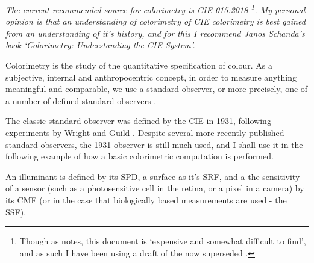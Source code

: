 \textit{The current recommended source for colorimetry is CIE 015:2018 \citep{cie_cie_2018}\footnote{Though as \citet{fairchild_cie_2019} notes, this document is `expensive and somewhat difficult to find', and as such I have been using a draft of the now superseded \citet{cie_cie_2004-2}.}. My personal opinion is that an understanding of colorimetry of CIE colorimetry is best gained from an understanding of it's history, and for this I recommend Janos Schanda's book `Colorimetry: Understanding the CIE System'\citep{schanda_colorimetry_2007}.}

Colorimetry is the study of the quantitative specification of colour. As a subjective, internal and anthropocentric concept, in order to measure anything meaningful and comparable, we use a standard observer, or more precisely, one of a number of defined standard observers \cite{cie_bs_2011}.

The classic standard observer was defined by the CIE in 1931, following experiments by Wright and Guild \cite{wright_re-determination_1929, guild_colorimetric_1931}. Despite several more recently published standard observers, the 1931 observer is still much used, and I shall use it in the following example of how a basic colorimetric computation is performed.

An illuminant is defined by its \gls{SPD}, a surface as it's \gls{SRF}, and a the sensitivity of a sensor (such as a photosensitive cell in the retina, or a pixel in a camera) by its \gls{CMF} (or in the case that biologically based measurements are used - the \gls{SSF}).

